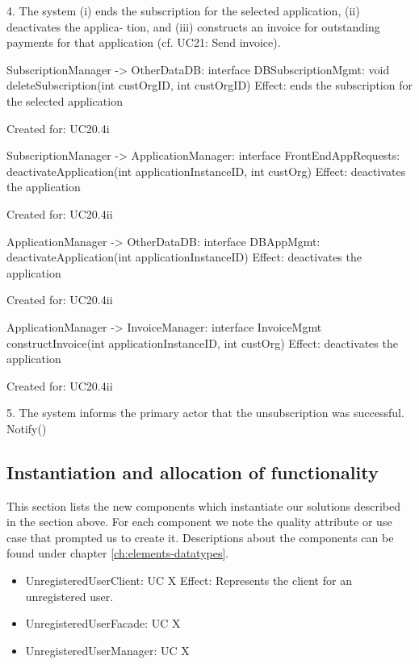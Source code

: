 {{{{{{{{        4. The system (i) ends the subscription for the selected application, (ii) deactivates the applica-
            tion, and (iii) constructs an invoice for outstanding payments for that application (cf. UC21:
            Send invoice).

            SubscriptionManager -> OtherDataDB: interface DBSubscriptionMgmt:
                                             void deleteSubscription(int custOrgID, int custOrgID)
                Effect: ends the subscription for the selected application
                \item Created for: UC20.4i

            SubscriptionManager -> ApplicationManager: interface FrontEndAppRequests:
                                    deactivateApplication(int applicationInstanceID, int custOrg)
                Effect: deactivates the application
                \item Created for: UC20.4ii

            ApplicationManager -> OtherDataDB: interface DBAppMgmt:
                                    deactivateApplication(int applicationInstanceID)
                Effect: deactivates the application
                \item Created for: UC20.4ii


            ApplicationManager  -> InvoiceManager: interface InvoiceMgmt
                                   constructInvoice(int applicationInstanceID, int custOrg)
                Effect: deactivates the application
                \item Created for: UC20.4ii


        5. The system informs the primary actor that the unsubscription was successful.
            Notify()

\subsection{Instantiation and allocation of functionality}
    This section lists the new components which instantiate our solutions
    described in the section above. For each component we note the quality
    attribute or use case that prompted us to create it. Descriptions about
    the components can be found under chapter \ref{ch:elements-datatypes}. \\

    \begin{itemize}
        \item UnregisteredUserClient: UC X
              Effect: Represents the client for an unregistered user.
        \item UnregisteredUserFacade: UC X
        \item UnregisteredUserManager: UC X
    \end{itemize}


}}}}}}}}
